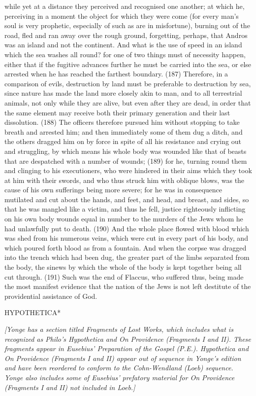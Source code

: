 while yet at a distance they perceived and recognised one another; at which he, perceiving in a
moment the object for which they were come (for every man's soul is very prophetic, especially of
such as are in misfortune), burning out of the road, fled and ran away over the rough ground,
forgetting, perhaps, that Andros was an island and not the continent. And what is the use of speed
in an island which the sea washes all round? for one of two things must of necessity happen, either
that if the fugitive advances further he must be carried into the sea, or else arrested when he has
reached the farthest boundary. (187) Therefore, in a comparison of evils, destruction by land must
be preferable to destruction by sea, since nature has made the land more closely akin to man, and
to all terrestrial animals, not only while they are alive, but even after they are dead, in order that the
same element may receive both their primary generation and their last dissolution. (188) The
officers therefore pursued him without stopping to take breath and arrested him; and then
immediately some of them dug a ditch, and the others dragged him on by force in spite of all his
resistance and crying out and struggling, by which means his whole body was wounded like that of
beasts that are despatched with a number of wounds; (189) for he, turning round them and clinging
to his executioners, who were hindered in their aims which they took at him with their swords, and
who thus struck him with oblique blows, was the cause of his own sufferings being more severe; for
he was in consequence mutilated and cut about the hands, and feet, and head, and breast, and
sides, so that he was mangled like a victim, and thus he fell, justice righteously inflicting on his own
body wounds equal in number to the murders of the Jews whom he had unlawfully put to death.
(190) And the whole place flowed with blood which was shed from his numerous veins, which were
cut in every part of his body, and which poured forth blood as from a fountain. And when the corpse
was dragged into the trench which had been dug, the greater part of the limbs separated from the
body, the sinews by which the whole of the body is kept together being all cut through. (191) Such
was the end of Flaccus, who suffered thus, being made the most manifest evidence that the nation
of the Jews is not left destitute of the providential assistance of God.


HYPOTHETICA*

\emph{[Yonge has a section titled Fragments of Lost Works, which includes what is recognized as Philo's Hypothetica and On
Providence (Fragments I and II). These fragments appear in Eusebius' Preparation of the Gospel (P.E.). Hypothetica and
On Providence (Fragments I and II) appear out of sequence in Yonge's edition and have been reordered to conform to the Cohn-Wendland (Loeb) sequence. Yonge also includes some of Eusebius' prefatory material for On Providence (Fragments I and II) not included in Loeb.]}

